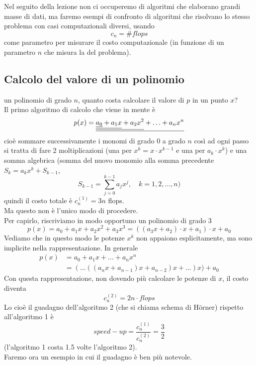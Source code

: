 \bigskip
Nel seguito della lezione non ci occuperemo di algoritmi che elaborano grandi masse di dati, ma faremo esempi di confronto di algoritmi che risolvano lo stesso problema con casi computazionali diversi, usando \[c_n = \# flops\] come parametro per misurare il costo computazionale (in funzione di un parametro $n$ che misura la  del problema). 

\subsection{Calcolo del valore di un polinomio}
un polinomio di grado $n$, quanto costa calcolare il valore di $p$ in un punto $x$? \\
Il primo algoritmo di calcolo che viene in mente è 
\[p(x) = \uline{\uline{\uline{\uline{a_0} + a_1x} + a_2x^2} + \dotsc + a_nx^n}\]
cioè sommare successivamente i monomi di grado 0 a grado $n$ così ad ogni passo si tratta di fare 2 moltiplicazioni (una per $x^k = x \cdot x^{k-1}$ e una per $a_k\cdot x^k$) e una somma algebrica (somma del nuovo monomio alla somma precedente $S_k = a_k x^k + S_{k-1}$, 
\[S_{k-1}=\sum_{j=0}^{k-1} a_j x^j,\quad k = 1,2,\dotsc,n)\]
quindi il costo totale è $c^{(1)}_{n} = 3n$ flops. \\
Ma questo non è l'unico modo di procedere.\\
Per capirlo, riscriviamo in modo opportuno un polinomio di grado 3
\[p(x) = a_0 + a_1x + a_2 x^2 + a_3 x^3 = ((a_3 x + a_2) \cdot x + a_1) \cdot x + a_0 \]
Vediamo che in questo modo le potenze $x^k$ non appaiono esplicitamente, ma sono implicite nella rappresentazione. In generale
\[\begin{split}
    p(x) & = a_0 + a_1x + \dotsc + a_nx^n \\
    & = (\dotsc((a_n x + a_{n-1}) x + a_{n-2}) x + \dotsc) x) + a_0 
\end{split}\]
Con questa rappresentazione, non dovendo più calcolare le potenze di $x$, il costo diventa
\[ c_n^{(2)}=2n\cdot flops \]
Lo  cioè il guadagno dell'algoritmo 2 (che si chiama schema di H\"orner) rispetto all'algoritmo 1 è
\[speed-up=\frac{c_n^{(1)}}{c_n^{(2)}}=\frac{3}{2}\]
(l'algoritmo 1 costa 1.5 volte l'algoritmo 2).\\ 
Faremo ora un esempio in cui il guadagno è ben più notevole.\newline

